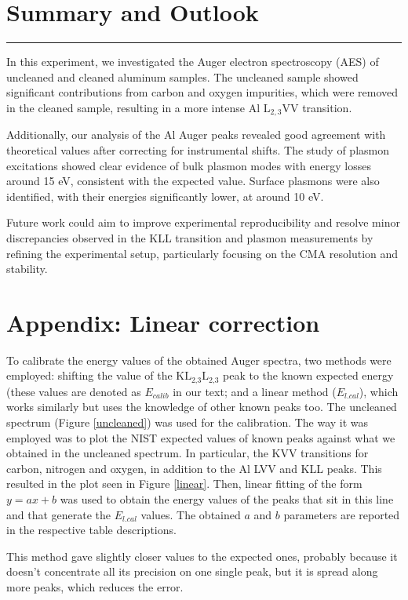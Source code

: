 \documentclass[12pt]{article}
\begin{document}
\section{Summary and Outlook}
\rule{\textwidth}{0.5pt}

In this experiment, we investigated the Auger electron spectroscopy (AES) of uncleaned and cleaned aluminum samples. The uncleaned sample showed significant contributions from carbon and oxygen impurities, which were removed in the cleaned sample, resulting in a more intense Al $\text{L}_{2,3}$VV transition.

Additionally, our analysis of the Al Auger peaks revealed good agreement with theoretical values after correcting for instrumental shifts. The study of plasmon excitations showed clear evidence of bulk plasmon modes with energy losses around 15 eV, consistent with the expected value. Surface plasmons were also identified, with their energies significantly lower, at around 10 eV.

Future work could aim to improve experimental reproducibility and resolve minor discrepancies observed in the KLL transition and plasmon measurements by refining the experimental setup, particularly focusing on the CMA resolution and stability.

\section{Appendix: Linear correction}
To calibrate the energy values of the obtained Auger spectra, two methods were employed: shifting the value of the $\text{K}\text{L}_{\text{2,3}}\text{L}_{\text{2,3}}$ peak to the known expected energy (these values are denoted as $E_{calib}$ in our text; and a linear method ($E_{l.cal}$), which works similarly but uses the knowledge of other known peaks too.
The uncleaned spectrum (Figure \ref{uncleaned}) was used for the calibration. The way it was employed was to plot the NIST expected values of known peaks against what we obtained in the uncleaned spectrum. In particular, the KVV transitions for carbon, nitrogen and oxygen, in addition to the Al LVV and KLL peaks. This resulted in the plot seen in Figure \ref{linear}. Then, linear fitting of the form $y = ax + b$ was used to obtain the energy values of the peaks that sit in this line and that generate the $E_{l.cal}$ values. The obtained $a$ and $b$ parameters are reported in the respective table descriptions.

This method gave slightly closer values to the expected ones, probably because it doesn't concentrate all its precision on one single peak, but it is spread along more peaks, which reduces the error.
\end{document}
